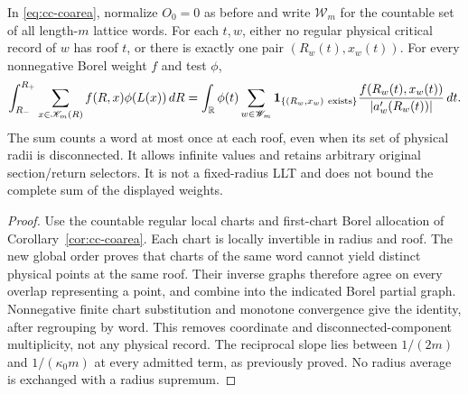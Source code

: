 \begin{corollary}
\label{cor:gv-word-coarea}
In \eqref{eq:cc-coarea}, normalize $O_0=0$ as before and write
$\mathscr W_m$ for the countable set of all length-$m$ lattice words.
For each $t,w$, either no regular physical critical record of $w$
has roof $t$, or there is exactly one pair $(R_w(t),x_w(t))$.
For every nonnegative Borel weight $f$ and test $\phi$,
\begin{equation}\label{eq:gv-word-coarea}
 \int_{R_-}^{R_+}\sum_{x\in\mathscr K_m(R)}f(R,x)\phi(L(x))\,dR
 =\int_{\mathbb R}\phi(t)\sum_{w\in\mathscr W_m}
 \mathbf1_{\{(R_w,x_w)\ {\rm exists}\}}
 \frac{f(R_w(t),x_w(t))}{|a_w'(R_w(t))|}\,dt.
\end{equation}
The sum counts a word at most once at each roof, even when its set of
physical radii is disconnected. It allows infinite values and retains
arbitrary original section/return selectors. It is not a fixed-radius
LLT and does not bound the complete sum of the displayed weights.
\end{corollary}
\begin{proof}
Use the countable regular local charts and first-chart Borel allocation
of Corollary~\ref{cor:cc-coarea}. Each chart is locally invertible in
radius and roof. The new global order proves that charts of the same
word cannot yield distinct physical points at the same roof. Their
inverse graphs therefore agree on every overlap representing a point,
and combine into the indicated Borel partial graph. Nonnegative finite
chart substitution and monotone convergence give the identity, after
regrouping by word. This removes coordinate and disconnected-component
multiplicity, not any physical record. The reciprocal slope lies between
$1/(2m)$ and $1/(\kappa_0m)$ at every admitted term, as previously
proved. No radius average is exchanged with a radius supremum.
\end{proof}
